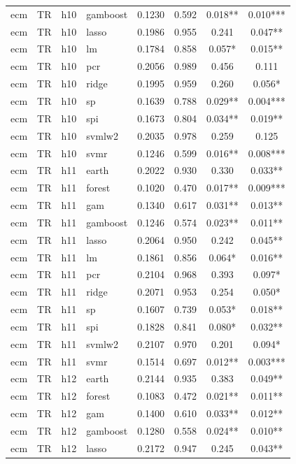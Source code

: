 \begin{ThreePartTable}
\begin{longtable}[t]{llclcccc}
ecm & TR & h10 & gamboost & 0.1230 & 0.592 & 0.018** & 0.010***\\
ecm & TR & h10 & lasso & 0.1986 & 0.955 & 0.241 & 0.047**\\
ecm & TR & h10 & lm & 0.1784 & 0.858 & 0.057* & 0.015**\\
ecm & TR & h10 & pcr & 0.2056 & 0.989 & 0.456 & 0.111\\
ecm & TR & h10 & ridge & 0.1995 & 0.959 & 0.260 & 0.056*\\
ecm & TR & h10 & sp & 0.1639 & 0.788 & 0.029** & 0.004***\\
ecm & TR & h10 & spi & 0.1673 & 0.804 & 0.034** & 0.019**\\
ecm & TR & h10 & svmlw2 & 0.2035 & 0.978 & 0.259 & 0.125\\
ecm & TR & h10 & svmr & 0.1246 & 0.599 & 0.016** & 0.008***\\
\addlinespace
ecm & TR & h11 & earth & 0.2022 & 0.930 & 0.330 & 0.033**\\
ecm & TR & h11 & forest & 0.1020 & 0.470 & 0.017** & 0.009***\\
ecm & TR & h11 & gam & 0.1340 & 0.617 & 0.031** & 0.013**\\
ecm & TR & h11 & gamboost & 0.1246 & 0.574 & 0.023** & 0.011**\\
ecm & TR & h11 & lasso & 0.2064 & 0.950 & 0.242 & 0.045**\\
ecm & TR & h11 & lm & 0.1861 & 0.856 & 0.064* & 0.016**\\
ecm & TR & h11 & pcr & 0.2104 & 0.968 & 0.393 & 0.097*\\
ecm & TR & h11 & ridge & 0.2071 & 0.953 & 0.254 & 0.050*\\
ecm & TR & h11 & sp & 0.1607 & 0.739 & 0.053* & 0.018**\\
ecm & TR & h11 & spi & 0.1828 & 0.841 & 0.080* & 0.032**\\
ecm & TR & h11 & svmlw2 & 0.2107 & 0.970 & 0.201 & 0.094*\\
ecm & TR & h11 & svmr & 0.1514 & 0.697 & 0.012** & 0.003***\\
\addlinespace
ecm & TR & h12 & earth & 0.2144 & 0.935 & 0.383 & 0.049**\\
ecm & TR & h12 & forest & 0.1083 & 0.472 & 0.021** & 0.011**\\
ecm & TR & h12 & gam & 0.1400 & 0.610 & 0.033** & 0.012**\\
ecm & TR & h12 & gamboost & 0.1280 & 0.558 & 0.024** & 0.010**\\
ecm & TR & h12 & lasso & 0.2172 & 0.947 & 0.245 & 0.043**\\

\end{longtable}
\end{ThreePartTable}
